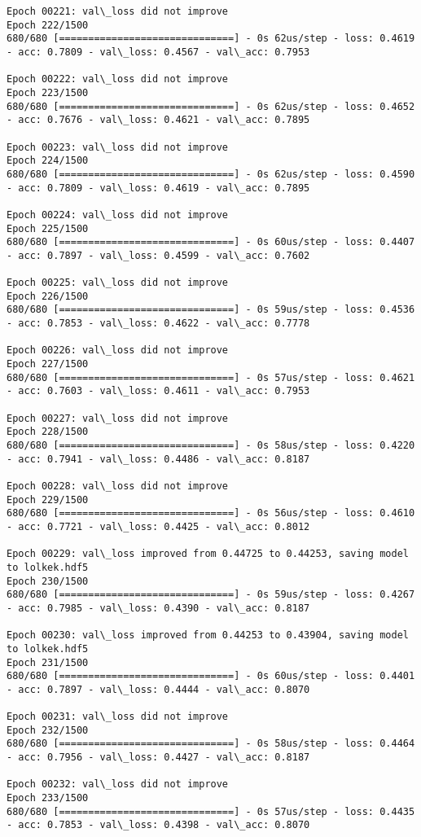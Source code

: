 \documentclass[11pt]{article}
\begin{document}
\begin{Verbatim}[commandchars=\\\{\}]
Epoch 00221: val\_loss did not improve
Epoch 222/1500
680/680 [==============================] - 0s 62us/step - loss: 0.4619 - acc: 0.7809 - val\_loss: 0.4567 - val\_acc: 0.7953

Epoch 00222: val\_loss did not improve
Epoch 223/1500
680/680 [==============================] - 0s 62us/step - loss: 0.4652 - acc: 0.7676 - val\_loss: 0.4621 - val\_acc: 0.7895

Epoch 00223: val\_loss did not improve
Epoch 224/1500
680/680 [==============================] - 0s 62us/step - loss: 0.4590 - acc: 0.7809 - val\_loss: 0.4619 - val\_acc: 0.7895

Epoch 00224: val\_loss did not improve
Epoch 225/1500
680/680 [==============================] - 0s 60us/step - loss: 0.4407 - acc: 0.7897 - val\_loss: 0.4599 - val\_acc: 0.7602

Epoch 00225: val\_loss did not improve
Epoch 226/1500
680/680 [==============================] - 0s 59us/step - loss: 0.4536 - acc: 0.7853 - val\_loss: 0.4622 - val\_acc: 0.7778

Epoch 00226: val\_loss did not improve
Epoch 227/1500
680/680 [==============================] - 0s 57us/step - loss: 0.4621 - acc: 0.7603 - val\_loss: 0.4611 - val\_acc: 0.7953

Epoch 00227: val\_loss did not improve
Epoch 228/1500
680/680 [==============================] - 0s 58us/step - loss: 0.4220 - acc: 0.7941 - val\_loss: 0.4486 - val\_acc: 0.8187

Epoch 00228: val\_loss did not improve
Epoch 229/1500
680/680 [==============================] - 0s 56us/step - loss: 0.4610 - acc: 0.7721 - val\_loss: 0.4425 - val\_acc: 0.8012

Epoch 00229: val\_loss improved from 0.44725 to 0.44253, saving model to lolkek.hdf5
Epoch 230/1500
680/680 [==============================] - 0s 59us/step - loss: 0.4267 - acc: 0.7985 - val\_loss: 0.4390 - val\_acc: 0.8187

Epoch 00230: val\_loss improved from 0.44253 to 0.43904, saving model to lolkek.hdf5
Epoch 231/1500
680/680 [==============================] - 0s 60us/step - loss: 0.4401 - acc: 0.7897 - val\_loss: 0.4444 - val\_acc: 0.8070

Epoch 00231: val\_loss did not improve
Epoch 232/1500
680/680 [==============================] - 0s 58us/step - loss: 0.4464 - acc: 0.7956 - val\_loss: 0.4427 - val\_acc: 0.8187

Epoch 00232: val\_loss did not improve
Epoch 233/1500
680/680 [==============================] - 0s 57us/step - loss: 0.4435 - acc: 0.7853 - val\_loss: 0.4398 - val\_acc: 0.8070


\end{Verbatim}
\end{document}
